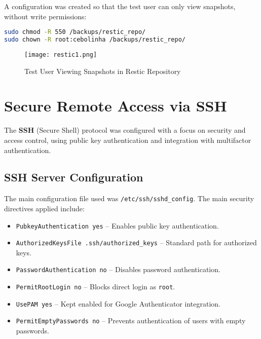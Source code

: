 \documentclass[12pt]{report}
\begin{document}
A configuration was created so that the test user can only view snapshots, without write permissions:

\begin{lstlisting}[language=bash, caption={Read Permission for Test User}]
sudo chmod -R 550 /backups/restic_repo/
sudo chown -R root:cebolinha /backups/restic_repo/
\end{lstlisting}

\begin{figure}[h]
    \centering
    \texttt{[image: restic1.png]}
    \caption{Test User Viewing Snapshots in Restic Repository}
    \label{fig:restic-snapshots}
\end{figure}

\clearpage

\section*{Secure Remote Access via SSH}

The \textbf{SSH} (Secure Shell) protocol was configured with a focus on security and access control, using public key authentication and integration with multifactor authentication.

\subsection*{SSH Server Configuration}

The main configuration file used was \texttt{/etc/ssh/sshd\_config}. The main security directives applied include:

\begin{itemize}
    \item \texttt{PubkeyAuthentication yes} – Enables public key authentication.
    \item \texttt{AuthorizedKeysFile .ssh/authorized\_keys} – Standard path for authorized keys.
    \item \texttt{PasswordAuthentication no} – Disables password authentication.
    \item \texttt{PermitRootLogin no} – Blocks direct login as \texttt{root}.
    \item \texttt{UsePAM yes} – Kept enabled for Google Authenticator integration.
    \item \texttt{PermitEmptyPasswords no} – Prevents authentication of users with empty passwords.
\end{itemize}
\end{document}

